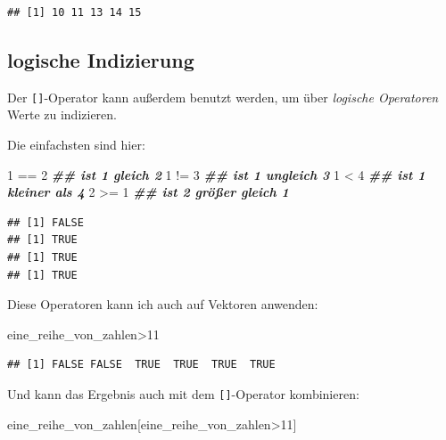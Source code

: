 \documentclass[
]{book}
\newenvironment{Shaded}{\begin{snugshade}}{\end{snugshade}}
\newcommand{\DecValTok}[1]{\textcolor[rgb]{0.00,0.00,0.81}{#1}}
\newcommand{\DocumentationTok}[1]{\textcolor[rgb]{0.56,0.35,0.01}{\textbf{\textit{#1}}}}
\newcommand{\NormalTok}[1]{#1}
\newcommand{\SpecialCharTok}[1]{\textcolor[rgb]{0.00,0.00,0.00}{#1}}
\begin{document}
\begin{verbatim}
## [1] 10 11 13 14 15
\end{verbatim}

\hypertarget{logische-indizierung}{%
\subsection{logische Indizierung}\label{logische-indizierung}}

Der \texttt{{[}{]}}-Operator kann außerdem benutzt werden, um über \emph{logische Operatoren} Werte zu indizieren.

Die einfachsten sind hier:

\begin{Shaded}
\begin{Highlighting}[]
\DecValTok{1} \SpecialCharTok{==} \DecValTok{2} \DocumentationTok{\#\# ist 1 gleich 2}
\DecValTok{1} \SpecialCharTok{!=} \DecValTok{3} \DocumentationTok{\#\# ist 1 ungleich 3}
\DecValTok{1} \SpecialCharTok{\textless{}} \DecValTok{4}  \DocumentationTok{\#\# ist 1 kleiner als 4}
\DecValTok{2} \SpecialCharTok{\textgreater{}=} \DecValTok{1} \DocumentationTok{\#\# ist 2 größer gleich 1}
\end{Highlighting}
\end{Shaded}

\begin{verbatim}
## [1] FALSE
## [1] TRUE
## [1] TRUE
## [1] TRUE
\end{verbatim}

Diese Operatoren kann ich auch auf Vektoren anwenden:

\begin{Shaded}
\begin{Highlighting}[]
\NormalTok{eine\_reihe\_von\_zahlen}\SpecialCharTok{\textgreater{}}\DecValTok{11}
\end{Highlighting}
\end{Shaded}

\begin{verbatim}
## [1] FALSE FALSE  TRUE  TRUE  TRUE  TRUE
\end{verbatim}

Und kann das Ergebnis auch mit dem \texttt{{[}{]}}-Operator kombinieren:

\begin{Shaded}
\begin{Highlighting}[]
\NormalTok{eine\_reihe\_von\_zahlen[eine\_reihe\_von\_zahlen}\SpecialCharTok{\textgreater{}}\DecValTok{11}\NormalTok{]}
\end{Highlighting}
\end{Shaded}
\end{document}
